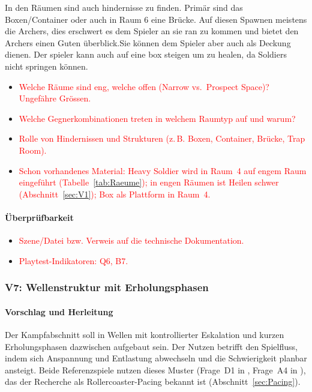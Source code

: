 \documentclass[../Main.tex]{subfiles}
\begin{document}
In den Räumen sind auch hindernisse zu finden. Primär sind das Boxen/Container oder auch in Raum 6 eine Brücke. Auf diesen Spawnen meistens die Archers, dies erschwert es dem Spieler an sie ran zu kommen und bietet den Archers einen Guten überblick.Sie können dem Spieler aber auch als Deckung dienen. Der spieler kann auch auf eine box steigen um zu healen, da Soldiers nicht springen können.
\begin{itemize}[leftmargin=1.5cm]
    \item \textcolor{red}{Welche Räume sind eng, welche offen (Narrow vs.\ Prospect Space)? Ungefähre Grössen.}
    \item \textcolor{red}{Welche Gegnerkombinationen treten in welchem Raumtyp auf und warum?}
    \item \textcolor{red}{Rolle von Hindernissen und Strukturen (z.\,B. Boxen, Container, Brücke, Trap Room).}
    \item \textcolor{red}{Schon vorhandenes Material: Heavy Soldier wird in Raum~4 auf engem Raum eingeführt (Tabelle~\ref{tab:Raeume}); in engen Räumen ist Heilen schwer (Abschnitt~\ref{sec:V1}); Box als Plattform in Raum~4.}
\end{itemize}

\paragraph{Überprüfbarkeit}
\begin{itemize}[leftmargin=1.5cm]
    \item \textcolor{red}{Szene/Datei bzw. Verweis auf die technische Dokumentation.}
    \item \textcolor{red}{Playtest-Indikatoren: Q6, B7.}
\end{itemize}

\subsubsection{V7: Wellenstruktur mit Erholungsphasen} \label{sec:V7}

\paragraph{Vorschlag und Herleitung}
Der Kampfabschnitt soll in Wellen mit kontrollierter Eskalation und kurzen Erholungsphasen dazwischen aufgebaut sein. Der Nutzen betrifft den Spielfluss, indem sich Anspannung und Entlastung abwechseln und die Schwierigkeit planbar ansteigt. Beide Referenzspiele nutzen dieses Muster (Frage~D1 in , Frage~A4 in ), das der Recherche als Rollercoaster-Pacing bekannt ist (Abschnitt~\ref{sec:Pacing}).
\end{document}
